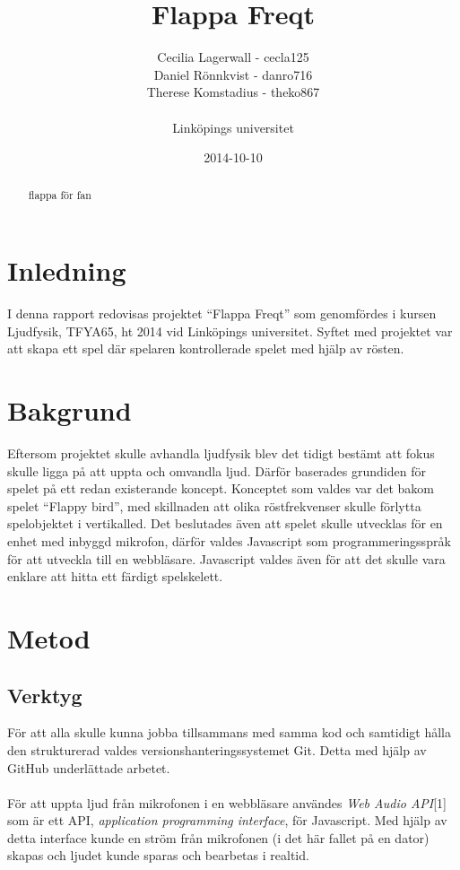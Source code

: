 \documentclass[12pt, titlepage, twoside, a4paper]{article}
\begin{document}
\title{Flappa Freqt}
\author{Cecilia Lagerwall - cecla125 \\ Daniel Rönnkvist - danro716 \\ 
Therese Komstadius - theko867 \\ \\ Linköpings universitet}
\date{2014-10-10}
\maketitle
\begin{abstract}
flappa för fan
\end{abstract}
\section{Inledning}
I denna rapport redovisas projektet “Flappa Freqt” som genomfördes i kursen Ljudfysik, TFYA65, ht 2014 vid Linköpings universitet. Syftet med projektet var att skapa ett spel där spelaren kontrollerade spelet med hjälp av rösten.
\section{Bakgrund}
Eftersom projektet skulle avhandla ljudfysik blev det tidigt bestämt att fokus skulle ligga på att uppta och omvandla ljud. Därför baserades grundiden för spelet på ett redan existerande koncept. Konceptet som valdes var det bakom spelet “Flappy bird”, med skillnaden att olika röstfrekvenser skulle förlytta spelobjektet i vertikalled. Det beslutades även att spelet skulle utvecklas för en enhet med inbyggd mikrofon, därför valdes Javascript som programmeringsspråk för att utveckla till en webbläsare. Javascript valdes även för att det skulle vara enklare att hitta ett färdigt spelskelett.
\section{Metod}
\subsection{Verktyg}
För att alla skulle kunna jobba tillsammans med samma kod och samtidigt hålla den strukturerad valdes versionshanteringssystemet Git. Detta med hjälp av GitHub underlättade arbetet.
\\ \\
För att uppta ljud från mikrofonen i en webbläsare användes \textit{Web Audio API}[1] som är ett API, \textit{application programming interface}, för Javascript. Med hjälp av detta interface kunde en ström från mikrofonen (i det här fallet på en dator) skapas och ljudet kunde sparas och bearbetas i realtid.
\end{document}
